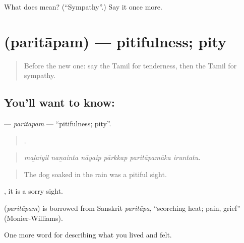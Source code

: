 \begin{tcolorbox}[breakable,colback=teal!4,colframe=teal!35!black,title={Before you move on}]
What does  mean? (\textquotedblleft{}Sympathy\textquotedblright{}.) Say it once more.
\end{tcolorbox}
\section[\texorpdfstring{\ta{பரிதாபம்} (paritāpam)}{பரிதாபம் (paritāpam)}]{ (paritāpam) — pitifulness; pity}

\label{lesson:TA-C457-paritapam}



\begin{quote}
Before the new one: say the Tamil for tenderness, then the Tamil for sympathy.
\end{quote}

\subsection*{You'll want to know: }
\textbf{} — \emph{paritāpam} — \textquotedblleft{}pitifulness; pity\textquotedblright{}.

\begin{quote}
     .
\end{quote}

\begin{quote}
\emph{maḻaiyil naṉainta nāyaip pārkkap paritāpamāka iruntatu.}
\end{quote}

\begin{quote}
The dog soaked in the rain was a pitiful sight.
\end{quote}

 , it is a sorry sight.

\begin{cousinweb}
\textbf{} (\emph{paritāpam}) is borrowed from Sanskrit \emph{paritāpa}, \textquotedblleft{}scorching heat; pain, grief\textquotedblright{} (Monier-Williams).
\end{cousinweb}

\begin{grammarlens}[title={What you've built}]
One more word for describing what you lived and felt.
\end{grammarlens}

